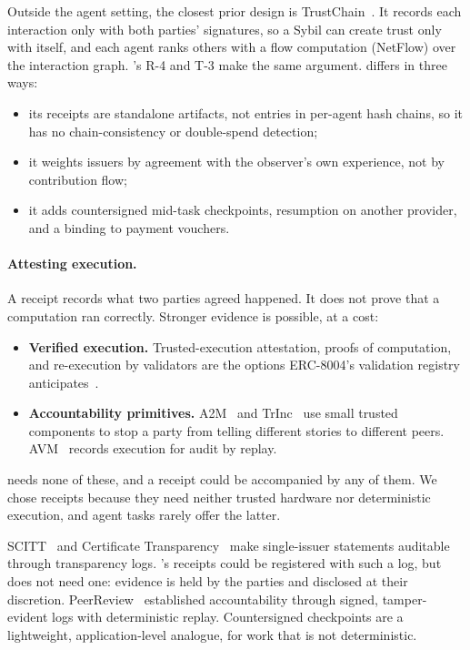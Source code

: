 Outside the agent setting, the closest prior design is
TrustChain~\cite{otte2020trustchain}.
It records each interaction only with both parties' signatures, so a
Sybil can create trust only with itself, and each agent ranks others with
a flow computation (NetFlow) over the interaction graph. \sys{}'s R-4 and
T-3 make the same argument. \sys{} differs in three ways:
\begin{itemize}
\item its receipts are standalone artifacts, not entries in per-agent
  hash chains, so it has no chain-consistency or double-spend detection;
\item it weights issuers by agreement with the observer's own experience,
  not by contribution flow;
\item it adds countersigned mid-task checkpoints, resumption on another
  provider, and a binding to payment vouchers.
\end{itemize}

\paragraph{Attesting execution.}
A receipt records what two parties agreed happened. It does not prove
that a computation ran correctly. Stronger evidence is possible, at a
cost:
\begin{itemize}
\item \textbf{Verified execution.} Trusted-execution attestation, proofs
  of computation, and re-execution by validators are the options ERC-8004's
  validation registry anticipates~\cite{erc8004}.
\item \textbf{Accountability primitives.} A2M~\cite{chun2007a2m} and
  TrInc~\cite{levin2009trinc} use small trusted components to stop a
  party from telling different stories to different peers.
  AVM~\cite{haeberlen2010avm} records execution for audit by replay.
\end{itemize}
\sys{} needs none of these, and a receipt could be accompanied by any of
them. We chose receipts because they need neither trusted hardware nor
deterministic execution, and agent tasks rarely offer the latter.

SCITT~\cite{rfc9943} and Certificate Transparency~\cite{rfc6962} make
single-issuer statements auditable through transparency logs. \sys{}'s
receipts could be registered with such a log, but \sys{} does not need
one: evidence is held by the parties and disclosed at their discretion.
PeerReview~\cite{haeberlen2007peerreview} established accountability
through signed, tamper-evident logs with deterministic replay.
Countersigned checkpoints are a lightweight, application-level analogue,
for work that is not deterministic.

